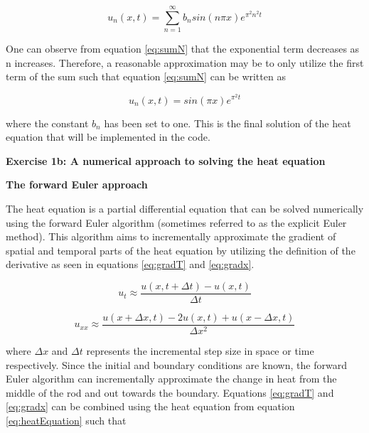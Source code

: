 \documentclass[12pt,a4paper]{article}
\begin{document}
\begin{equation}\label{eq:sumN}
u_n(x,t) = \sum_{n=1}^{\infty} b_n sin(n\pi x)e^{\pi^2 n^2 t}
\end{equation}

\noindent One can observe from equation \ref{eq:sumN} that the exponential term decreases as n increases. Therefore, a reasonable approximation may be to only utilize the first term of the sum such that equation \ref{eq:sumN} can be written as

\begin{equation}\label{eq:finalSol}
u_n(x,t) = sin(\pi x)e^{\pi^2 t}
\end{equation}

\noindent where the constant $b_n$ has been set to one. This is the final solution of the heat equation that will be implemented in the code.

\newpage

\begin{center}
\Large{\textbf{Exercise 1b: A numerical approach to solving the heat equation}}
\end{center}

\begin{center}
\large{\textbf{The forward Euler approach}}
\end{center}

\noindent The heat equation is a partial differential equation that can be solved numerically using the forward Euler algorithm (sometimes referred to as the explicit Euler method). This algorithm aims to incrementally approximate the gradient of spatial and temporal parts of the heat equation by utilizing the definition of the derivative as seen in equations \ref{eq:gradT} and \ref{eq:gradx}.

\begin{equation}\label{eq:gradT}
u_t \approx \frac{u(x, t+\Delta t) - u(x,t)}{\Delta t}
\end{equation}

\begin{equation}\label{eq:gradx}
u_{xx} \approx \frac{u(x + \Delta x, t) - 2u(x,t) + u(x-\Delta x,t)}{\Delta x^2}
\end{equation}

\noindent where $\Delta x$ and $\Delta t$ represents the incremental step size in space or time respectively. Since the initial and boundary conditions are known, the forward Euler algorithm can incrementally approximate the change in heat from the middle of the rod and out towards the boundary. Equations \ref{eq:gradT} and \ref{eq:gradx} can be combined using the heat equation from equation \ref{eq:heatEquation} such that
\end{document}
